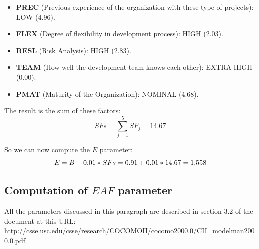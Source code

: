 \documentclass[../../../../projectPlan.tex]{subfiles}
\begin{document}
			\begin{itemize}
				\item \textbf{PREC} (Previous experience of the organization with these type of projects): LOW (4.96).
				\item \textbf{FLEX} (Degree of flexibility in development process): HIGH (2.03).
				\item \textbf{RESL} (Risk Analysis): HIGH (2.83).
				\item \textbf{TEAM} (How well the development team knows each other): EXTRA HIGH (0.00).
				\item \textbf{PMAT} (Maturity of the Organization): NOMINAL (4.68).
			\end{itemize}

			The result is the sum of these factors:
			\[SFs = \sum_{j=1}^{5} SF_j = 14.67 \]

			So we can now compute the \(E\) parameter:
			\[E = B + 0.01 * SFs \\
			    = 0.91 + 0.01 * 14.67
			    = 1.558\]

		\subsection{Computation of \(EAF\) parameter}
			All the parameters discussed in this paragraph are described in section 3.2 of the document at this URL: \url{http://csse.usc.edu/csse/research/COCOMOII/cocomo2000.0/CII_modelman2000.0.pdf}
\end{document}
